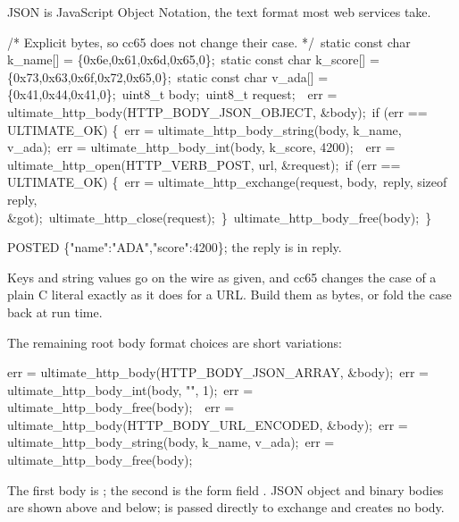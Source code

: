 JSON is JavaScript Object Notation, the text format most web services take.

\begin{listingbox}
/* Explicit bytes, so cc65 does not change their case. */\
static const char k\_name[] = \{0x6e,0x61,0x6d,0x65,0\};\
static const char k\_score[] = \{0x73,0x63,0x6f,0x72,0x65,0\};\
static const char v\_ada[] = \{0x41,0x44,0x41,0\};\
uint8\_t body;\
uint8\_t request;\
\
err = ultimate\_http\_body(HTTP\_BODY\_JSON\_OBJECT, \&body);\
if (err == ULTIMATE\_OK) \{\
\hspace*{1em}err = ultimate\_http\_body\_string(body, k\_name, v\_ada);\
\hspace*{1em}err = ultimate\_http\_body\_int(body, k\_score, 4200);\
\
\hspace*{1em}err = ultimate\_http\_open(HTTP\_VERB\_POST, url, \&request);\
\hspace*{1em}if (err == ULTIMATE\_OK) \{\
\hspace*{2em}err = ultimate\_http\_exchange(request, body,\
\hspace*{3em}reply, sizeof reply, \&got);\
\hspace*{2em}ultimate\_http\_close(request);\
\hspace*{1em}\}\
\hspace*{1em}ultimate\_http\_body\_free(body);\
\}
\end{listingbox}

\begin{resultbox}
POSTED \{"name":"ADA","score":4200\}; the reply is in reply.
\end{resultbox}

Keys and string values go on the wire as given, and cc65 changes the case of a
plain C literal exactly as it does for a URL. Build them as bytes, or fold the
case back at run time.

The remaining root body format choices are short variations:

\begin{listingbox}
err = ultimate\_http\_body(HTTP\_BODY\_JSON\_ARRAY, \&body);\
err = ultimate\_http\_body\_int(body, "", 1);\
err = ultimate\_http\_body\_free(body);\
\
err = ultimate\_http\_body(HTTP\_BODY\_URL\_ENCODED, \&body);\
err = ultimate\_http\_body\_string(body, k\_name, v\_ada);\
err = ultimate\_http\_body\_free(body);
\end{listingbox}

\begin{resultbox}
The first body is \cmd{[1]}; the second is the form field
. JSON object and binary bodies are shown above and below;
 is passed directly to exchange and creates no body.
\end{resultbox}

